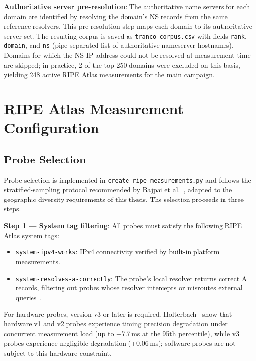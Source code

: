 \textbf{Authoritative server pre-resolution}: The authoritative name servers for each domain are identified by resolving the domain's \ac{NS} records from the same reference resolvers. This pre-resolution step maps each domain to its authoritative server set. The resulting corpus is saved as \texttt{tranco\_corpus.csv} with fields \texttt{rank}, \texttt{domain}, and \texttt{ns} (pipe-separated list of authoritative nameserver hostnames). Domains for which the \ac{NS} \ac{IP} address could not be resolved at measurement time are skipped; in practice, 2 of the top-250 domains were excluded on this basis, yielding 248 active RIPE Atlas measurements for the main campaign.

\section{RIPE Atlas Measurement Configuration}
\label{sec:3.3}

\subsection{Probe Selection}
\label{subsec:3.3.1}

Probe selection is implemented in \texttt{create\_ripe\_measurements.py} and follows the stratified-sampling protocol recommended by Bajpai et al.~\cite{Bajpai2017}, adapted to the geographic diversity requirements of this thesis. The selection proceeds in three steps.

\textbf{Step 1 --- System tag filtering}: All probes must satisfy the following RIPE Atlas system tags:

\begin{itemize}
  \item \texttt{system-ipv4-works}: \ac{IPv4} connectivity verified by built-in platform measurements.
  \item \texttt{system-resolves-a-correctly}: The probe's local resolver returns correct \ac{A} records, filtering out probes whose resolver intercepts or misroutes external queries~\cite{Boswell2024}.

\end{itemize}

For hardware probes, version v3 or later is required. Holterbach~\cite{Holterbach2015} show that hardware v1 and v2 probes experience timing precision degradation under concurrent measurement load (up to +7.7\,ms at the 95th percentile), while v3 probes experience negligible degradation (+0.06\,ms); software probes are not subject to this hardware constraint.


